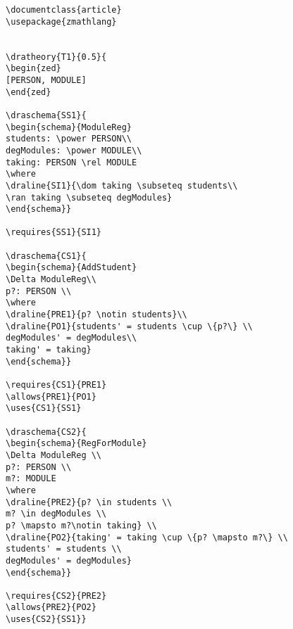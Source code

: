 \begin{verbatim}
\documentclass{article}
\usepackage{zmathlang}


\dratheory{T1}{0.5}{
\begin{zed}
[PERSON, MODULE]
\end{zed}

\draschema{SS1}{
\begin{schema}{ModuleReg}
students: \power PERSON\\
degModules: \power MODULE\\
taking: PERSON \rel MODULE
\where
\draline{SI1}{\dom taking \subseteq students\\
\ran taking \subseteq degModules}
\end{schema}}

\requires{SS1}{SI1}

\draschema{CS1}{
\begin{schema}{AddStudent}
\Delta ModuleReg\\
p?: PERSON \\
\where
\draline{PRE1}{p? \notin students}\\
\draline{PO1}{students' = students \cup \{p?\} \\
degModules' = degModules\\
taking' = taking}
\end{schema}}

\requires{CS1}{PRE1}
\allows{PRE1}{PO1}
\uses{CS1}{SS1}

\draschema{CS2}{
\begin{schema}{RegForModule}
\Delta ModuleReg \\
p?: PERSON \\
m?: MODULE
\where
\draline{PRE2}{p? \in students \\
m? \in degModules \\
p? \mapsto m?\notin taking} \\
\draline{PO2}{taking' = taking \cup \{p? \mapsto m?\} \\
students' = students \\
degModules' = degModules}
\end{schema}}

\requires{CS2}{PRE2}
\allows{PRE2}{PO2}
\uses{CS2}{SS1}}

\end{verbatim}